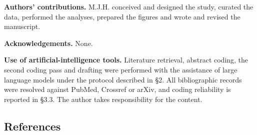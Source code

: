 \documentclass[11pt]{article}
\begin{document}
\textbf{Authors' contributions.} M.J.H. conceived and designed the
study, curated the data, performed the analyses, prepared the figures
and wrote and revised the manuscript.

\textbf{Acknowledgements.} None.

\textbf{Use of artificial-intelligence tools.} Literature retrieval,
abstract coding, the second coding pass and drafting were performed with
the assistance of large language models under the protocol described in
§2. All bibliographic records were resolved against PubMed, Crossref or
arXiv, and coding reliability is reported in §3.3. The author takes
responsibility for the content.

\subsection{References}\label{references}
\end{document}
